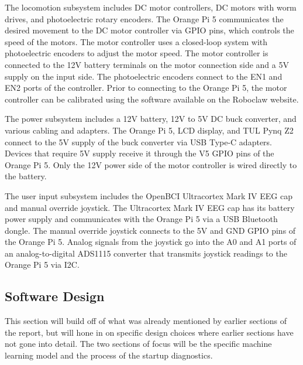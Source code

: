 \documentclass[conference]{IEEEtran}
\begin{document}
    The locomotion subsystem includes DC motor controllers, DC motors with worm drives, and photoelectric rotary encoders. The Orange Pi 5 communicates the desired movement to the DC motor controller via GPIO pins, which controls the speed of the motors. The motor controller uses a closed-loop system with photoelectric encoders to adjust the motor speed. The motor controller is connected to the 12V battery terminals on the motor connection side and a 5V supply on the input side. The photoelectric encoders connect to the EN1 and EN2 ports of the controller. Prior to connecting to the Orange Pi 5, the motor controller can be calibrated using the software available on the Roboclaw \cite{roboclaw} website.

    The power subsystem includes a 12V battery, 12V to 5V DC buck converter, and various cabling and adapters. The Orange Pi 5, LCD display, and TUL Pynq Z2 connect to the 5V supply of the buck converter via USB Type-C adapters. Devices that require 5V supply receive it through the V5 GPIO pins of the Orange Pi 5. Only the 12V power side of the motor controller is wired directly to the battery.

    The user input subsystem includes the OpenBCI Ultracortex Mark IV EEG cap and manual override joystick. The Ultracortex Mark IV EEG cap has its battery power supply and communicates with the Orange Pi 5 via a USB Bluetooth dongle. The manual override joystick connects to the 5V and GND GPIO pins of the Orange Pi 5. Analog signals from the joystick go into the A0 and A1 ports of an analog-to-digital ADS1115 converter that transmits joystick readings to the Orange Pi 5 via I2C. 
    
    \subsection{Software Design}
    This section will build off of what was already mentioned by earlier sections of the report, but will hone in on specific design choices where earlier sections have not gone into detail. The two sections of focus will be the specific machine learning model and the process of the startup diagnostics. 
    
\end{document}
